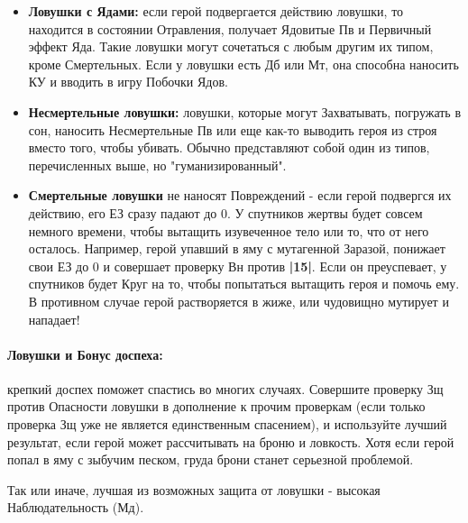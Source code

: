 \begin{itemize}
  \item \textbf{Ловушки с Ядами:} если герой подвергается действию ловушки, то находится в состоянии Отравления, получает Ядовитые Пв и Первичный эффект Яда.
    \newline Такие ловушки могут сочетаться с любым другим их типом, кроме Смертельных. Если у ловушки есть Дб или Мт, она способна наносить КУ и вводить в игру Побочки Ядов.
  \item \textbf{Несмертельные ловушки:} ловушки, которые могут Захватывать, погружать в сон, наносить Несмертельные Пв или еще как-то выводить героя из строя вместо того, чтобы убивать. Обычно представляют собой один из типов, перечисленных выше, но "гуманизированный".
  \item \textbf{Смертельные ловушки} не наносят Повреждений - если герой подвергся их действию, его ЕЗ сразу падают до 0. У спутников жертвы будет совсем немного времени, чтобы вытащить изувеченное тело или то, что от него осталось.
    \newline Например, герой упавший в яму с мутагенной Заразой, понижает свои ЕЗ до 0 и совершает проверку Вн против \textbf{|15|}. Если он преуспевает, у спутников будет Круг на то, чтобы попытаться вытащить героя и помочь ему. В противном случае герой растворяется в жиже, или чудовищно мутирует и нападает!
\end{itemize}
\paragraph{Ловушки и Бонус доспеха:} крепкий доспех поможет спастись во многих случаях. Совершите проверку Зщ против Опасности ловушки в дополнение к прочим проверкам (если только проверка Зщ уже не является единственным спасением), и используйте лучший результат, если герой может рассчитывать на броню и ловкость. Хотя если герой попал в яму с зыбучим песком, груда брони станет серьезной проблемой. 
\begin{tcolorbox}
  Так или иначе, лучшая из возможных защита от ловушки - высокая Наблюдательность (Мд).
\end{tcolorbox}